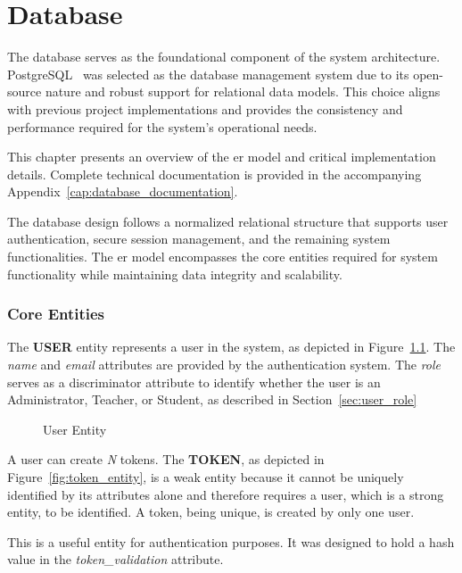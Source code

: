 \chapter{Database} \label{cap:database}
The database serves as the foundational component of the system architecture. PostgreSQL~\cite{postgresql} was selected as the database management system due to its open-source nature and robust support for relational data models. This choice aligns with previous project implementations and provides the consistency and performance required for the system's operational needs.

This chapter presents an overview of the \ac{er model} and critical implementation details. Complete technical documentation is provided in the accompanying Appendix~\ref{cap:database_documentation}.

The database design follows a normalized relational structure that supports user authentication, secure session management, and the remaining system functionalities. The \acs{er model} encompasses the core entities required for system functionality while maintaining data integrity and scalability.

\subsection{Core Entities}

The \textbf{USER} entity represents a user in the system, as depicted in Figure~\ref{fig:user_entity}. The \textit{name} and \textit{email} attributes are provided by the authentication system. The \textit{role} serves as a discriminator attribute to identify whether the user is an Administrator, Teacher, or Student, as described in Section~\ref{sec:user_role}

\begin{figure}[H]
    \centering
    
    \caption{User Entity}
    \label{fig:user_entity}
\end{figure}

A user can create \textit{N} tokens. The \textbf{TOKEN}, as depicted in Figure~\ref{fig:token_entity}, is a weak entity because it cannot be uniquely identified by its attributes alone and therefore requires a user, which is a strong entity, to be identified. A token, being unique, is created by only one user.

This is a useful entity for authentication purposes. It was designed to hold a hash value in the \textit{token\_validation} attribute.

